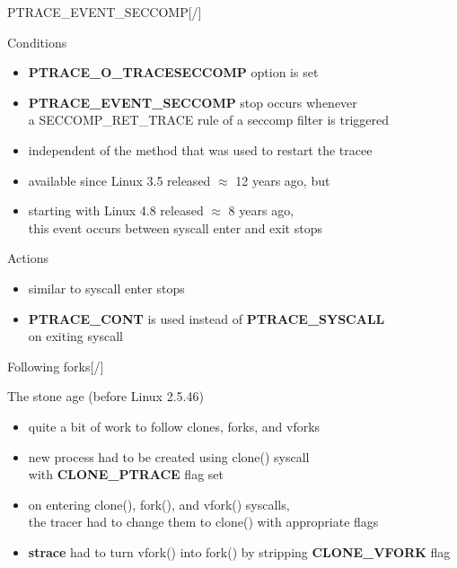 \documentclass[unicode,aspectratio=169,xcolor={table,dvipsnames,usernames}]{beamer}
\begin{document}
\begin{frame}{\Large PTRACE\_EVENT\_SECCOMP\hfill [\insertframenumber/\inserttotalframenumber]}
\large
\begin{block}{Conditions}
\begin{itemize}
	\item \textbf{PTRACE\_O\_TRACESECCOMP} option is set
	\item \textbf{PTRACE\_EVENT\_SECCOMP} stop occurs whenever \\
		a SECCOMP\_RET\_TRACE rule of a seccomp filter is triggered
	\item independent of the method that was used to restart the tracee
	\item available since Linux 3.5 released $\approx$ 12 years ago, but
	\item starting with Linux 4.8 released $\approx$ 8 years ago, \\
	       this event occurs between syscall enter and exit stops
\end{itemize}
\end{block}

\begin{block}{Actions}
\begin{itemize}
	\item similar to syscall enter stops
	\item \textbf{PTRACE\_CONT} is used instead of \textbf{PTRACE\_SYSCALL} \\
		on exiting syscall
\end{itemize}
\end{block}
\end{frame}

\begin{frame}{\Large Following forks\hfill [\insertframenumber/\inserttotalframenumber]}
\large
\begin{block}{The stone age (before Linux 2.5.46)}
\begin{itemize}
	\item quite a bit of work to follow clones, forks, and vforks
	\item new process had to be created using clone() syscall \\
		with \textbf{CLONE\_PTRACE} flag set
	\item on entering clone(), fork(), and vfork() syscalls, \\
		the tracer had to change them to clone() with appropriate flags
	\item \textbf{strace} had to turn vfork() into fork() by stripping \textbf{CLONE\_VFORK} flag
\end{itemize}
\end{block}
\end{frame}
\end{document}
